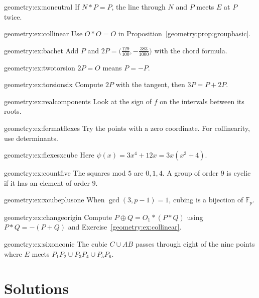 \begin{hint}{geometry:ex:noneutral}
If $N*P=P$, the line through $N$ and $P$ meets $E$ at $P$ twice.
\end{hint}
\begin{hint}{geometry:ex:collinear}
Use $O*O=O$ in Proposition~\ref{geometry:prop:groupbasic}.
\end{hint}
\begin{hint}{geometry:ex:bachet}
Add $P$ and $2P=\bigl(\frac{129}{100},-\frac{383}{1000}\bigr)$ with the chord formula.
\end{hint}
\begin{hint}{geometry:ex:twotorsion}
$2P=O$ means $P=-P$.
\end{hint}
\begin{hint}{geometry:ex:torsionsix}
Compute $2P$ with the tangent, then $3P=P+2P$.
\end{hint}
\begin{hint}{geometry:ex:realcomponents}
Look at the sign of $f$ on the intervals between its roots.
\end{hint}
\begin{hint}{geometry:ex:fermatflexes}
Try the points with a zero coordinate. For collinearity, use determinants.
\end{hint}
\begin{hint}{geometry:ex:flexesxcube}
Here $\psi(x)=3x^4+12x=3x(x^3+4)$.
\end{hint}
\begin{hint}{geometry:ex:countfive}
The squares mod $5$ are $0,1,4$. A group of order $9$ is cyclic if it has an element of order $9$.
\end{hint}
\begin{hint}{geometry:ex:xcubeplusone}
When $\gcd(3,p-1)=1$, cubing is a bijection of $\mathbb F_p$.
\end{hint}
\begin{hint}{geometry:ex:changeorigin}
Compute $P\oplus Q=O_1*(P*Q)$ using $P*Q=-(P+Q)$ and Exercise~\ref{geometry:ex:collinear}.
\end{hint}
\begin{hint}{geometry:ex:sixonconic}
The cubic $C\cup AB$ passes through eight of the nine points where $E$ meets $P_1P_2\cup P_3P_4\cup P_5P_6$.
\end{hint}

\section{Solutions}

